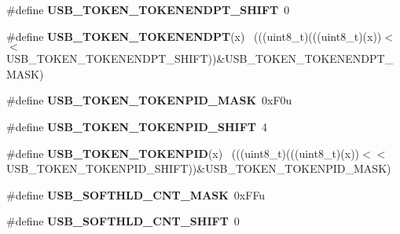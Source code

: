\begin{DoxyCompactItemize}
\item 
\hypertarget{group___u_s_b___register___masks_ga08c6b329c95f8ac5a39eecfbd347cce2}{}\#define {\bfseries U\+S\+B\+\_\+\+T\+O\+K\+E\+N\+\_\+\+T\+O\+K\+E\+N\+E\+N\+D\+P\+T\+\_\+\+S\+H\+I\+F\+T}~0\label{group___u_s_b___register___masks_ga08c6b329c95f8ac5a39eecfbd347cce2}

\item 
\hypertarget{group___u_s_b___register___masks_gaa5c3f8986b1cc1b25b57755c4bac5c18}{}\#define {\bfseries U\+S\+B\+\_\+\+T\+O\+K\+E\+N\+\_\+\+T\+O\+K\+E\+N\+E\+N\+D\+P\+T}(x)                                ~(((uint8\+\_\+t)(((uint8\+\_\+t)(x))$<$$<$U\+S\+B\+\_\+\+T\+O\+K\+E\+N\+\_\+\+T\+O\+K\+E\+N\+E\+N\+D\+P\+T\+\_\+\+S\+H\+I\+F\+T))\&U\+S\+B\+\_\+\+T\+O\+K\+E\+N\+\_\+\+T\+O\+K\+E\+N\+E\+N\+D\+P\+T\+\_\+\+M\+A\+S\+K)\label{group___u_s_b___register___masks_gaa5c3f8986b1cc1b25b57755c4bac5c18}

\item 
\hypertarget{group___u_s_b___register___masks_ga8880174ec35cfb684d2bcc6e0d5a52bc}{}\#define {\bfseries U\+S\+B\+\_\+\+T\+O\+K\+E\+N\+\_\+\+T\+O\+K\+E\+N\+P\+I\+D\+\_\+\+M\+A\+S\+K}~0x\+F0u\label{group___u_s_b___register___masks_ga8880174ec35cfb684d2bcc6e0d5a52bc}

\item 
\hypertarget{group___u_s_b___register___masks_gae410fcf426d2212be6468703734f6ed9}{}\#define {\bfseries U\+S\+B\+\_\+\+T\+O\+K\+E\+N\+\_\+\+T\+O\+K\+E\+N\+P\+I\+D\+\_\+\+S\+H\+I\+F\+T}~4\label{group___u_s_b___register___masks_gae410fcf426d2212be6468703734f6ed9}

\item 
\hypertarget{group___u_s_b___register___masks_ga71015e59468e70fbf922c9a784cf4109}{}\#define {\bfseries U\+S\+B\+\_\+\+T\+O\+K\+E\+N\+\_\+\+T\+O\+K\+E\+N\+P\+I\+D}(x)                                    ~(((uint8\+\_\+t)(((uint8\+\_\+t)(x))$<$$<$U\+S\+B\+\_\+\+T\+O\+K\+E\+N\+\_\+\+T\+O\+K\+E\+N\+P\+I\+D\+\_\+\+S\+H\+I\+F\+T))\&U\+S\+B\+\_\+\+T\+O\+K\+E\+N\+\_\+\+T\+O\+K\+E\+N\+P\+I\+D\+\_\+\+M\+A\+S\+K)\label{group___u_s_b___register___masks_ga71015e59468e70fbf922c9a784cf4109}

\item 
\hypertarget{group___u_s_b___register___masks_gab71f8a7be8b025453facbce8d45b7bcc}{}\#define {\bfseries U\+S\+B\+\_\+\+S\+O\+F\+T\+H\+L\+D\+\_\+\+C\+N\+T\+\_\+\+M\+A\+S\+K}~0x\+F\+Fu\label{group___u_s_b___register___masks_gab71f8a7be8b025453facbce8d45b7bcc}

\item 
\hypertarget{group___u_s_b___register___masks_gaf4b663b6276ba642abfdedf79fac92c6}{}\#define {\bfseries U\+S\+B\+\_\+\+S\+O\+F\+T\+H\+L\+D\+\_\+\+C\+N\+T\+\_\+\+S\+H\+I\+F\+T}~0\label{group___u_s_b___register___masks_gaf4b663b6276ba642abfdedf79fac92c6}


\end{DoxyCompactItemize}

